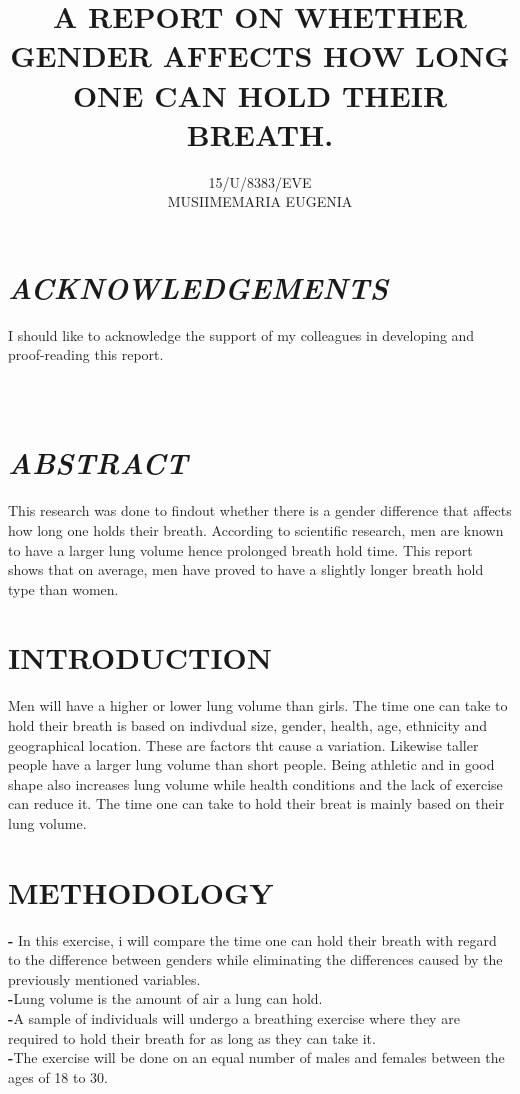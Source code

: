 \documentclass[12pt, letterpaper]{article}
\begin{document}
\title{\textbf{ A REPORT ON WHETHER GENDER AFFECTS HOW LONG ONE CAN HOLD THEIR BREATH.}}
\author{15/U/8383/EVE \\ MUSIIMEMARIA EUGENIA }
 \date{}
\maketitle 

\clearpage
\section*{\textbf{\emph{ACKNOWLEDGEMENTS}} } 
 I should like to acknowledge the support of my colleagues in 
developing and proof-reading this report.\\ \\ \\

\section*{\textbf{\emph{ABSTRACT}} }
This research was done to findout whether there is a gender
difference that affects how long one holds their breath. According to
scientific research, men are known to have a larger lung volume
hence prolonged breath hold time. This report shows that on average,
men have proved to have a slightly longer breath hold type than women.

\clearpage
\section{\textbf{INTRODUCTION} } 
Men will have a higher or lower lung volume than girls. The time
 one can take to hold their breath is based on indivdual size, gender, health,
age, ethnicity and geographical location. These are factors tht cause a
variation. Likewise taller people have a larger lung volume than short people.
Being athletic and in good shape also increases lung volume while health
conditions and the lack of exercise can reduce it. The time
one can take to hold their breat is mainly based on their lung volume.

\section{\textbf{METHODOLOGY} } 
\textbf{-} In this exercise, i will compare the time one can hold their breath with regard to the difference between genders while eliminating the differences caused by the previously mentioned variables.\\ 
\textbf{-}Lung volume is the amount of air a lung can hold.\\
\textbf{-}A sample of individuals will undergo a breathing exercise where they are
required to hold their breath for as long as they can take it.\\
\textbf{-}The exercise will be done on an equal number of males and females between the ages of 18 to 30.
\end{document}
